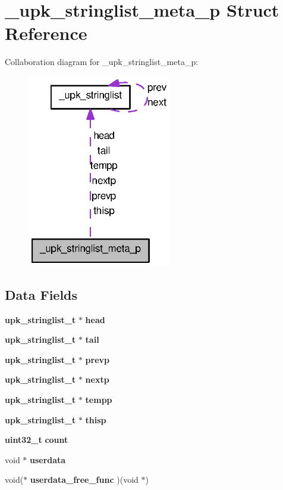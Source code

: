 \section{\_\-upk\_\-stringlist\_\-meta\_\-p Struct Reference}
\label{struct__upk__stringlist__meta__p}


Collaboration diagram for \_\-upk\_\-stringlist\_\-meta\_\-p:
\nopagebreak
\begin{figure}[H]
\begin{center}
\leavevmode
\includegraphics[width=178pt]{struct__upk__stringlist__meta__p__coll__graph}
\end{center}
\end{figure}
\subsection*{Data Fields}
\begin{DoxyCompactItemize}
\item 
{\bf upk\_\-stringlist\_\-t} $\ast$ {\bf head}
\item 
{\bf upk\_\-stringlist\_\-t} $\ast$ {\bf tail}
\item 
{\bf upk\_\-stringlist\_\-t} $\ast$ {\bf prevp}
\item 
{\bf upk\_\-stringlist\_\-t} $\ast$ {\bf nextp}
\item 
{\bf upk\_\-stringlist\_\-t} $\ast$ {\bf tempp}
\item 
{\bf upk\_\-stringlist\_\-t} $\ast$ {\bf thisp}
\item 
{\bf uint32\_\-t} {\bf count}
\item 
void $\ast$ {\bf userdata}
\item 
void($\ast$ {\bf userdata\_\-free\_\-func} )(void $\ast$)
\end{DoxyCompactItemize}


